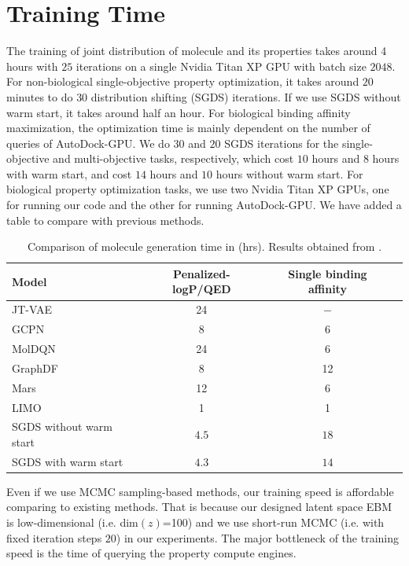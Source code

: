 \documentclass[accepted]{uai2023} %
\begin{document}
\section{Training Time}
\label{sec:a3}

The training of joint distribution of molecule and its properties takes around 4 hours with $25$ iterations on a single Nvidia Titan XP GPU with batch size $2048$. For non-biological single-objective property optimization, it takes around $20$ minutes to do $30$ distribution shifting (SGDS) iterations. If we use SGDS without warm start, it takes around half an hour. For biological binding affinity maximization, the optimization time is mainly dependent on the number of queries of AutoDock-GPU. We do $30$ and $20$ SGDS iterations for the single-objective and multi-objective tasks, respectively, which cost $10$ hours and $8$ hours with warm start, and cost $14$ hours and $10$ hours without warm start. For biological property optimization tasks, we use two Nvidia Titan XP GPUs, one for running our code and the other for running AutoDock-GPU. We have added a table to compare with previous methods.

\begin{table}[H]
\small
\begin{center}
\begin{tabular}{lccc}
\textbf{Model}                 & Penalized-logP/QED  &Single binding affinity\\ \hline
JT-VAE &24  &$-$  \\
GCPN & 8   &6                \\
MolDQN & 24  &6                 \\
GraphDF & 8   &12               \\
Mars   & 12  &6                   \\
LIMO   & 1  & 1                       \\
SGDS without warm start& $4.5$ & $18$ \\
SGDS with warm start& $4.3$ & $14$ \\
\end{tabular}
\end{center}
\caption{\small Comparison of molecule generation time in (hrs). Results obtained from \citep{eckmann2022limo}.}
\label{tab:time}
\end{table}

Even if we use MCMC sampling-based methods, our training speed is affordable comparing to existing methods. That is because our designed latent space EBM is low-dimensional (i.e. dim$(z)$=100) and we use short-run MCMC (i.e. with fixed iteration steps $20$) in our experiments. The major bottleneck of the training speed is the time of querying the property compute engines.
\end{document}
